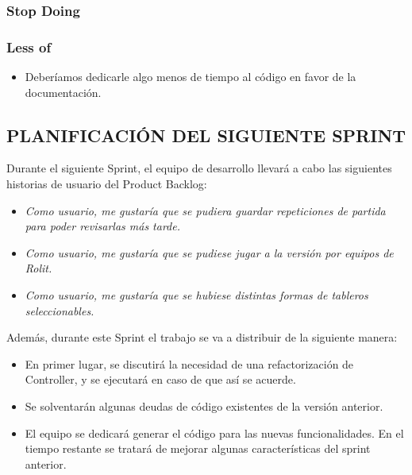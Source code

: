 \documentclass[../../SCRUM.tex]{subfiles}
\begin{document}
\subsubsection{Stop Doing}


\subsubsection{Less of}
\begin{itemize}
\item Deberíamos dedicarle algo menos de tiempo al código en favor de la documentación.
\end{itemize}

\subsection{PLANIFICACIÓN DEL SIGUIENTE SPRINT}
Durante el siguiente Sprint, el equipo de desarrollo llevará a cabo las siguientes historias de usuario del Product Backlog:
\begin{itemize}
\item \textit{Como usuario, me gustaría que se pudiera guardar repeticiones de partida para poder revisarlas más tarde.}
\item \textit{Como usuario, me gustaría que se pudiese jugar a la versión por equipos de Rolit.}
\item \textit{Como usuario, me gustaría que se hubiese distintas formas de tableros seleccionables.}
\end{itemize}
Además, durante este Sprint el trabajo se va a distribuir de la siguiente manera:
\begin{itemize}
\item En primer lugar, se discutirá la necesidad de una refactorización de Controller, y se ejecutará en caso de que así se acuerde.
\item Se solventarán algunas deudas de código existentes de la versión anterior.
\item El equipo se dedicará generar el código para las nuevas funcionalidades. En el tiempo restante se tratará de mejorar algunas características del sprint anterior.
\end{itemize}
\end{document}
